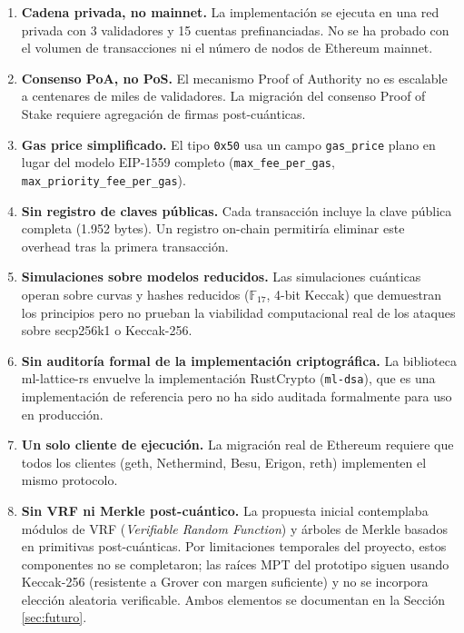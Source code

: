 \begin{enumerate}
  \item \textbf{Cadena privada, no mainnet.} La implementación se ejecuta en una red privada con 3 validadores y 15 cuentas prefinanciadas. No se ha probado con el volumen de transacciones ni el número de nodos de Ethereum mainnet.
  
  \item \textbf{Consenso PoA, no PoS.} El mecanismo Proof of Authority no es escalable a centenares de miles de validadores. La migración del consenso Proof of Stake requiere agregación de firmas post-cuánticas.
  
  \item \textbf{Gas price simplificado.} El tipo \texttt{0x50} usa un campo \texttt{gas\_price} plano en lugar del modelo EIP-1559 completo (\texttt{max\_fee\_per\_gas}, \texttt{max\_priority\_fee\_per\_gas}).
  
  \item \textbf{Sin registro de claves públicas.} Cada transacción incluye la clave pública completa (1.952 bytes). Un registro on-chain permitiría eliminar este overhead tras la primera transacción.
  
  \item \textbf{Simulaciones sobre modelos reducidos.} Las simulaciones cuánticas operan sobre curvas y hashes reducidos ($\mathbb{F}_{17}$, 4-bit Keccak) que demuestran los principios pero no prueban la viabilidad computacional real de los ataques sobre secp256k1 o Keccak-256.
  
  \item \textbf{Sin auditoría formal de la implementación criptográfica.} La biblioteca ml-lattice-rs envuelve la implementación RustCrypto (\texttt{ml-dsa}), que es una implementación de referencia pero no ha sido auditada formalmente para uso en producción.
  
  \item \textbf{Un solo cliente de ejecución.} La migración real de Ethereum requiere que todos los clientes (geth, Nethermind, Besu, Erigon, reth) implementen el mismo protocolo.
  
  \item \textbf{Sin VRF ni Merkle post-cuántico.} La propuesta inicial contemplaba módulos de VRF (\emph{Verifiable Random Function}) y árboles de Merkle basados en primitivas post-cuánticas. Por limitaciones temporales del proyecto, estos componentes no se completaron; las raíces MPT del prototipo siguen usando Keccak-256 (resistente a Grover con margen suficiente) y no se incorpora elección aleatoria verificable. Ambos elementos se documentan en la Sección \ref{sec:futuro}.
\end{enumerate}


